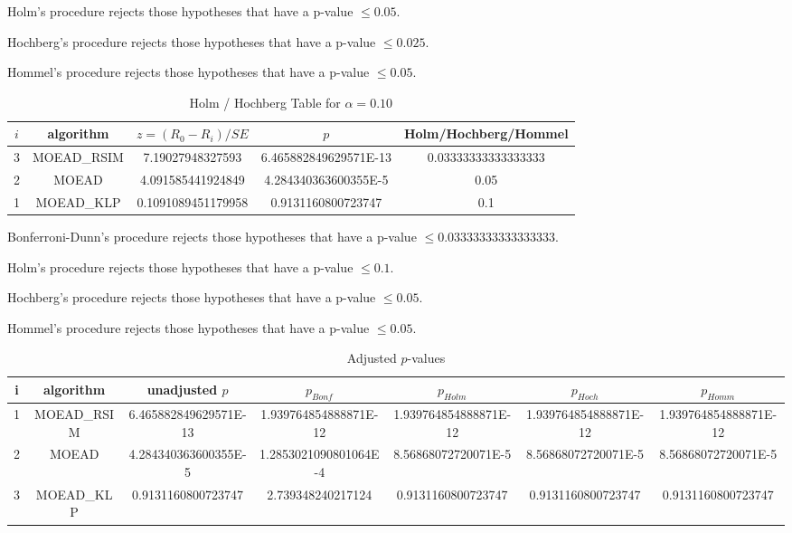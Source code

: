 \documentclass[a4paper,10pt]{article}
\begin{document}
\begin{landscape}
Holm's procedure rejects those hypotheses that have a p-value $\le0.05$.


Hochberg's procedure rejects those hypotheses that have a p-value $\le0.025$.


Hommel's procedure rejects those hypotheses that have a p-value $\le0.05$.


\begin{table}[!htp]
\centering\tiny
\caption{Holm / Hochberg Table for $\alpha=0.10$}
\begin{tabular}{ccccc}
$i$&algorithm&$z=(R_0 - R_i)/SE$&$p$&Holm/Hochberg/Hommel\\
\hline
3&MOEAD_RSIM&7.19027948327593&6.465882849629571E-13&0.03333333333333333\\
2&MOEAD&4.091585441924849&4.284340363600355E-5&0.05\\
1&MOEAD_KLP&0.1091089451179958&0.9131160800723747&0.1\\
\hline
\end{tabular}
\end{table}
Bonferroni-Dunn's procedure rejects those hypotheses that have a p-value $\le0.03333333333333333$.


Holm's procedure rejects those hypotheses that have a p-value $\le0.1$.


Hochberg's procedure rejects those hypotheses that have a p-value $\le0.05$.


Hommel's procedure rejects those hypotheses that have a p-value $\le0.05$.


\begin{table}[!htp]
\centering\tiny
\caption{Adjusted $p$-values}
\begin{tabular}{ccccccc}
i&algorithm&unadjusted $p$&$p_{Bonf}$&$p_{Holm}$&$p_{Hoch}$&$p_{Homm}$\\
\hline
1&MOEAD_RSIM&6.465882849629571E-13&1.939764854888871E-12&1.939764854888871E-12&1.939764854888871E-12&1.939764854888871E-12\\
2&MOEAD&4.284340363600355E-5&1.2853021090801064E-4&8.56868072720071E-5&8.56868072720071E-5&8.56868072720071E-5\\
3&MOEAD_KLP&0.9131160800723747&2.739348240217124&0.9131160800723747&0.9131160800723747&0.9131160800723747\\
\hline
\end{tabular}
\end{table}


\end{landscape}
\end{document}
